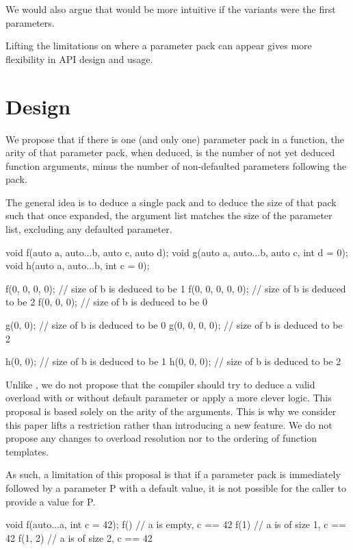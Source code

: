 \documentclass{wg21}
\begin{document}
We would also argue that  would be more intuitive if the variants were the first parameters.

Lifting the limitations on where a parameter pack can appear gives more flexibility in API design and usage.

\section{Design}

We propose that if there is one (and only one) parameter pack in a function,
the arity of that parameter pack, when deduced, is the number of not yet deduced function arguments, minus the number of non-defaulted
parameters following the pack.

The general idea is to deduce a single pack and to deduce the size of that pack such that once expanded,
the argument list matches the size of the parameter list, excluding any defaulted parameter.

\begin{colorblock}
void f(auto a, auto...b, auto c, auto d);
void g(auto a, auto...b, auto c, int d = 0);
void h(auto a, auto...b, int c = 0);


f(0, 0, 0, 0);      // size of b is deduced to be 1
f(0, 0, 0, 0, 0);   // size of b is deduced to be 2
f(0, 0, 0);         // size of b is deduced to be 0

g(0, 0);           // size of b is deduced to be 0
g(0, 0, 0, 0);     // size of b is deduced to be 2

h(0, 0);           // size of b is deduced to be 1
h(0, 0, 0);        // size of b is deduced to be 2

\end{colorblock}

Unlike , we do not propose that the compiler should try to deduce a valid overload with or without default parameter or apply
a more clever logic.
This proposal is based solely on the arity of the arguments.
This is why we consider this paper lifts a restriction rather than introducing a new feature.
We do not propose any changes to overload resolution nor to the ordering of function templates.

As such, a limitation of this proposal is that if a parameter pack is immediately followed by a parameter P with a default value,
it is not possible for the caller to provide a value for P.

\begin{colorblock}
void f(auto...a, int c = 42);
f()     // a is empty, c == 42
f(1)    // a is of size 1,  c == 42
f(1, 2) // a is of size 2,  c == 42

\end{colorblock}
\end{document}
